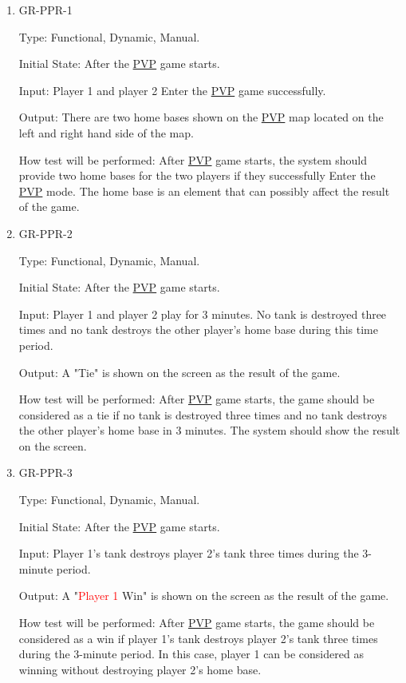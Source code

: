 \documentclass[12pt, titlepage]{article}
\begin{document}
\begin{enumerate}

\item{GR-PPR-1\\}

Type: Functional, Dynamic, Manual.
					
Initial State: After the \underline{PVP} game starts.
					
Input: Player 1 and player 2 Enter the \underline{PVP} game successfully.
					
Output: There are two home bases shown on the \underline{PVP} map located on the left and right hand side of the map.
					
How test will be performed: After \underline{PVP} game starts, the system should provide two home bases for the two players if they successfully Enter the \underline{PVP} mode. The home base is an element that can possibly affect the result of the game. 

\item{GR-PPR-2\\}

Type: Functional, Dynamic, Manual.
					
Initial State: After the \underline{PVP} game starts.
					
Input: Player 1 and player 2 play for 3 minutes. No tank is destroyed three times and no tank destroys the other player's home base during this time period.
					
Output: A "Tie" is shown on the screen as the result of the game.
					
How test will be performed: After \underline{PVP} game starts, the game should be considered as a tie if no tank is destroyed three times and no tank destroys the other player's home base in 3 minutes. The system should show the result on the screen.

\item{GR-PPR-3\\}

Type: Functional, Dynamic, Manual.
					
Initial State: After the \underline{PVP} game starts.
					
Input: Player 1's tank destroys player 2's tank three times during the 3-minute period.
					
Output: A "\textcolor{red}{Player 1 }Win" is shown on the screen as the result of the game.
					
How test will be performed: After \underline{PVP} game starts, the game should be considered as a win if player 1's tank destroys player 2's tank three times during the 3-minute period. In this case, player 1 can be considered as winning without destroying player 2's home base.


\end{enumerate}
\end{document}
